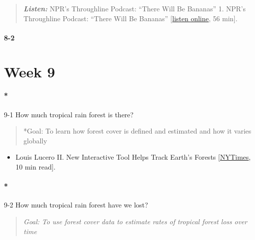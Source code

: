 \documentclass[
  10pt,
  letterpaper,
  oneside,
  open=any]{scrbook}
\let\oldparagraph\paragraph
\renewcommand{\paragraph}[1]{\oldparagraph{#1}\mbox{}}
\providecommand{\tightlist}{%
  \setlength{\itemsep}{0pt}\setlength{\parskip}{0pt}}\usepackage{longtable,booktabs,array}
\begin{document}
\begin{quote}
\textbf{\emph{Listen:}} NPR's Throughline Podcast: ``There Will Be
Bananas'' 1. NPR's Throughline Podcast: ``There Will Be Bananas''
{[}\href{https://www.npr.org/2020/01/07/794302086/there-will-be-bananas}{listen
online}, 56 min{]}.
\end{quote}

\paragraph{8-2}\label{section-1}

\section*{Week 9}\label{week-9}


\paragraph*{9-1 How much tropical rain forest is
there?}\label{how-much-tropical-rain-forest-is-there}

\begin{quote}
*Goal: To learn how forest cover is defined and estimated and how it
varies globally
\end{quote}

\begin{itemize}
\tightlist
\item
  Louis Lucero II. New Interactive Tool Helps Track Earth's Forests
  {[}\href{https://www.nytimes.com/2013/11/15/science/earth/new-interactive-tool-helps-track-earths-forests.html}{NYTimes},
  10 min read{]}.
\end{itemize}

\paragraph*{9-2 How much tropical rain forest have we
lost?}\label{how-much-tropical-rain-forest-have-we-lost}

\begin{quote}
\emph{Goal: To use forest cover data to estimate rates of tropical
forest loss over time}
\end{quote}
\end{document}
